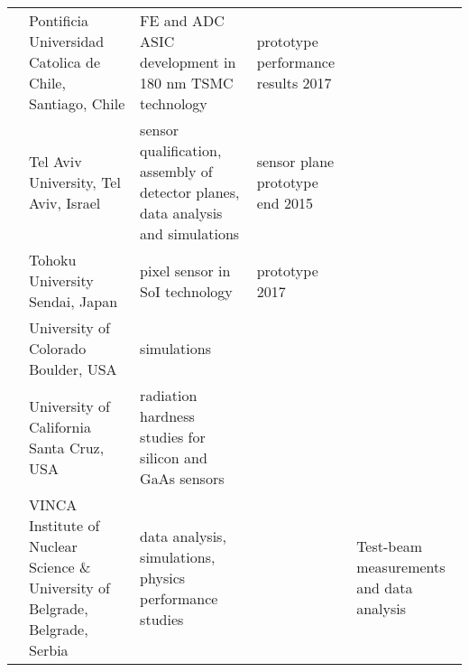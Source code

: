 \begin{landscape}
\begin{adjustbox}{max width=1.1\textwidth,totalheight=1\textheight}
\begin{tabularx}{1.1\textheight}{lXXXX}
     \cmidrule{2-5}
     & Pontificia Universidad Catolica de Chile, Santiago, Chile &
     FE and ADC ASIC development in 180 nm TSMC technology &
     prototype performance results 2017 & \\
     \cmidrule{2-5}
     & Tel Aviv University, Tel Aviv, Israel &
     sensor qualification, assembly of detector planes, data analysis and simulations &
     sensor plane prototype end 2015 & \\
     \cmidrule{2-5}
     & Tohoku University Sendai, Japan &
     pixel sensor in SoI technology &
     prototype 2017 & \\
     \cmidrule{2-5}
     & University of Colorado Boulder, USA &
     simulations & & \\
     \cmidrule{2-5}
     & University of California Santa Cruz, USA &
     radiation hardness studies for silicon and GaAs sensors & & \\
     \cmidrule{2-5}
     & VINCA Institute of Nuclear Science \& University of Belgrade, Belgrade, Serbia &
     data analysis, simulations, physics performance studies &
     & Test-beam measurements and data analysis\\
    \bottomrule
\end{tabularx}
\end{adjustbox}
\end{landscape}
\restoregeometry

